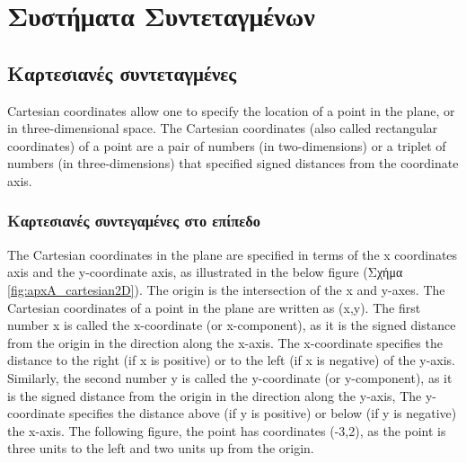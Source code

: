 \chapter{Συστήματα Συντεταγμένων}
\label{apx:coordinates}

\section{Καρτεσιανές συντεταγμένες}
Cartesian coordinates allow one to specify the location of a point in the plane, or in three-dimensional space. The Cartesian coordinates (also called rectangular coordinates) of a point are a pair of numbers (in two-dimensions) or a triplet of numbers (in three-dimensions) that specified signed distances from the coordinate axis.

\subsection{Καρτεσιανές συντεγαμένες στο επίπεδο}
The Cartesian coordinates in the plane are specified in terms of the x coordinates axis and the y-coordinate axis, as illustrated in the below figure (Σχήμα \ref{fig:apxA_cartesian2D}). The origin is the intersection of the x and y-axes. The Cartesian coordinates of a point in the plane are written as (x,y). The first number x is called the x-coordinate (or x-component), as it is the signed distance from the origin in the direction along the x-axis. The x-coordinate specifies the distance to the right (if x is positive) or to the left (if x is negative) of the y-axis. Similarly, the second number y is called the y-coordinate (or y-component), as it is the signed distance from the origin in the direction along the y-axis, The y-coordinate specifies the distance above (if y is positive) or below (if y is negative) the x-axis. The following figure, the point has coordinates (-3,2), as the point is three units to the left and two units up from the origin.

